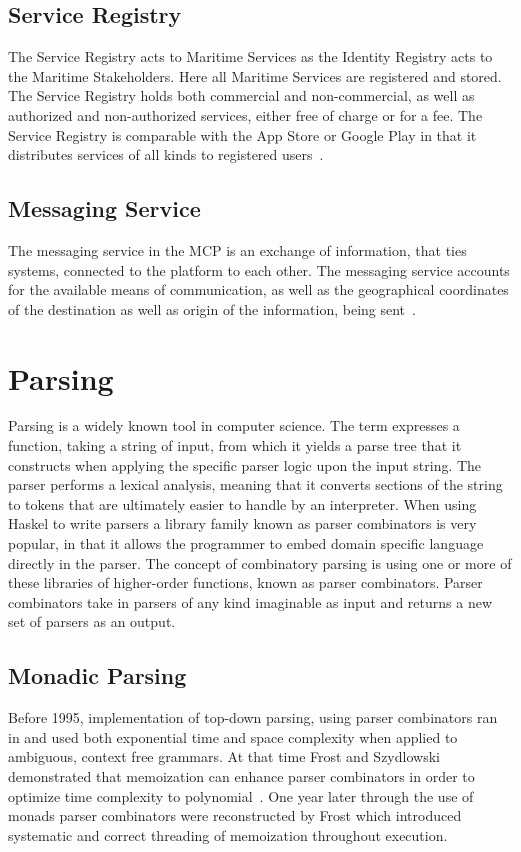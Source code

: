 \subsection{Service Registry}
The Service Registry acts to Maritime Services as the Identity Registry acts to the Maritime Stakeholders. Here all Maritime Services are registered and stored. The Service Registry holds both commercial and non-commercial, as well as authorized and non-authorized services, either free of charge or for a fee. The Service Registry is comparable with the App Store or Google Play in that it distributes services of all kinds to registered users~\cite{efficienSea2}.
\subsection{Messaging Service}
The messaging service in the MCP is an exchange of information, that ties systems, connected to the platform to each other. The messaging service accounts for the available means of communication, as well as the geographical coordinates of the destination as well as origin of the information, being sent~\cite{efficienSea2}.

\section{Parsing}
Parsing is a widely known tool in computer science. The term expresses a function, taking a string of input, from which it yields a parse tree that it constructs when applying the specific parser logic upon the input string. The parser performs a lexical analysis, meaning that it converts sections of the string to tokens that are ultimately easier to handle by an interpreter. When using Haskel to write parsers a library family known as parser combinators is very popular, in that it allows the programmer to embed domain specific language directly in the parser. The concept of combinatory parsing is using one or more of these libraries of higher-order functions, known as parser combinators. Parser combinators take in parsers of any kind imaginable as input and returns a new set of parsers as an output.
\newpage
\subsection{Monadic Parsing}
Before 1995, implementation of top-down parsing, using parser combinators ran in and used both exponential time and space complexity when applied to ambiguous, context free grammars. At that time Frost and Szydlowski demonstrated that memoization can enhance parser combinators in order to optimize time complexity to polynomial~\cite{memoization}. One year later through the use of monads parser combinators were reconstructed by Frost which introduced systematic and correct threading of memoization throughout execution.

